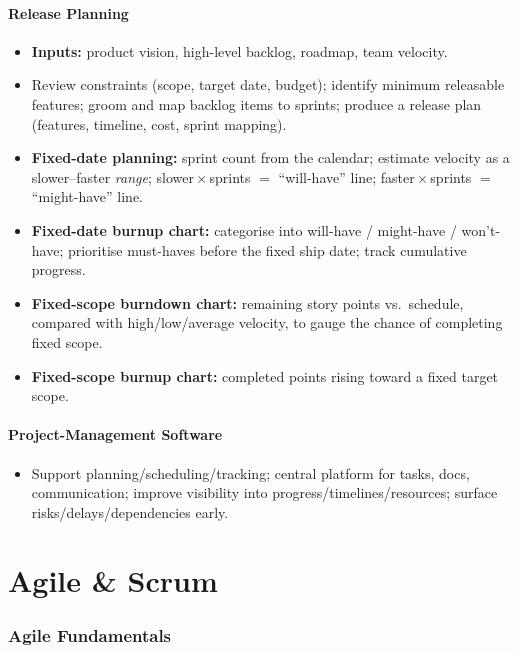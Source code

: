\documentclass[hidelinks]{article}
\begin{document}
\subsection{Release Planning}
\begin{itemize}
  \item \textbf{Inputs:} product vision, high-level backlog, roadmap, team velocity.
  \item Review constraints (scope, target date, budget); identify minimum releasable features;
        groom and map backlog items to sprints; produce a release plan (features, timeline, cost,
        sprint mapping).
  \item \textbf{Fixed-date planning:} sprint count from the calendar; estimate velocity as a
        slower--faster \emph{range}; slower\,$\times$\,sprints $=$ ``will-have'' line;
        faster\,$\times$\,sprints $=$ ``might-have'' line.
  \item \textbf{Fixed-date burnup chart:} categorise into will-have / might-have / won't-have;
        prioritise must-haves before the fixed ship date; track cumulative progress.
  \item \textbf{Fixed-scope burndown chart:} remaining story points vs.\ schedule, compared with
        high/low/average velocity, to gauge the chance of completing fixed scope.
  \item \textbf{Fixed-scope burnup chart:} completed points rising toward a fixed target scope.
\end{itemize}

\subsection{Project-Management Software}
\begin{itemize}
  \item Support planning/scheduling/tracking; central platform for tasks, docs, communication;
        improve visibility into progress/timelines/resources; surface risks/delays/dependencies early.
\end{itemize}

\part{Agile \& Scrum}

\section{Agile Fundamentals}
\end{document}
